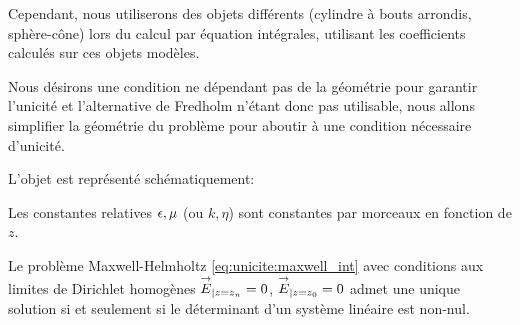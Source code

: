     Cependant, nous utiliserons des objets différents (cylindre à bouts arrondis, sphère-cône) lors du calcul par équation intégrales, utilisant les coefficients calculés sur ces objets modèles.

    Nous désirons une condition ne dépendant pas de la géométrie pour garantir l'unicité et l'alternative de Fredholm n'étant donc pas utilisable,
    nous allons simplifier la géométrie du problème pour aboutir à une condition nécessaire d'unicité.

    L'objet est représenté schématiquement:
    \begin{figure}[h!btp]
        \centering
        \begin{tikzpicture}
            
        \end{tikzpicture}
    \end{figure}

    Les constantes relatives \(\eps,\mu\) (ou \(k,\eta\)) sont constantes par morceaux en fonction de \(z\).
    \begin{prop}
      \label{prop:unicite:interieur:postulat:multi-couche}
      Le problème Maxwell-Helmholtz \eqref{eq:unicite:maxwell_int} avec conditions aux limites de Dirichlet homogènes \(\vE_{|z=z_n} = 0\), \(\vE_{|z=z_0} = 0\) admet une unique solution si et seulement si le déterminant d'un système linéaire est non-nul.
    \end{prop}


